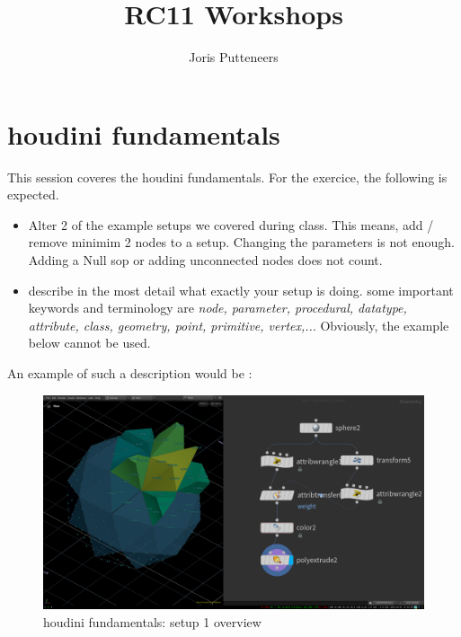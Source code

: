 \documentclass[11pt, a4paper, twoside]{article}
\begin{document}
\title{RC11 Workshops}
\author{Joris Putteneers}
\date{}
\maketitle

	\section*{houdini fundamentals}

This session coveres the houdini fundamentals. For the exercice, the
following is expected.

	\begin{itemize}
		\item 

Alter 2 of the example setups we covered during class.
This means, add / remove minimim 2 nodes to a setup. Changing the parameters is
not enough. Adding a Null sop or adding unconnected nodes does not count.

	 	\item 
describe in the most detail what exactly your setup is doing. some important
keywords and terminology are  \textit{ node, parameter,
procedural, datatype, attribute, class, geometry, point, primitive, vertex,..}. Obviously, the example below cannot be used.
 
	\end{itemize}	
	An example of such a description would be :

	\begin{figure}[h]
		\centering
		\includegraphics[width=\textwidth]{media/houdini_fundamentals_overview.png}
		\caption{houdini fundamentals: setup 1 overview}
		\label{fig:assignment1}
	\end{figure}
\end{document}
